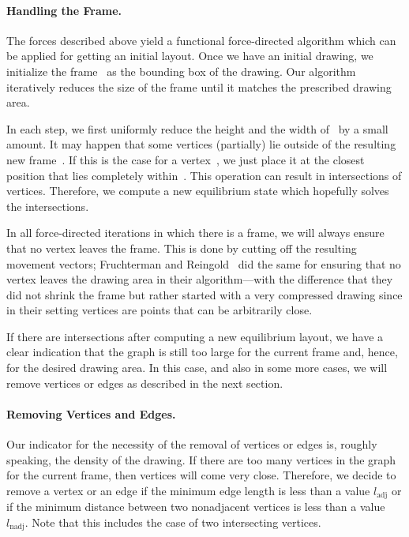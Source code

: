 \documentclass[]{llncs}
\newcommand{\ladj}{\ensuremath{l_\mathrm{adj}}\xspace}
\newcommand{\lnadj}{\ensuremath{l_\mathrm{nadj}}\xspace}
\begin{document}
\paragraph{Handling the Frame.}
\label{sec:gen-frame-handling}
The forces described above yield a functional
force-directed algorithm which can be applied for getting an
initial layout. Once we have an initial drawing, we initialize the
frame~ as the bounding box of the drawing. Our algorithm
iteratively reduces the size of the frame until it matches the
prescribed drawing area.

In each step, we first uniformly reduce the height and the width
of~ by a small amount. It may happen that some vertices (partially)
lie outside of the resulting new frame~. If this is the case for a
vertex~, we just place it at the closest position that lies
completely within~. This operation can result in intersections of
vertices. Therefore, we compute a new equilibrium state which
hopefully solves the intersections.

In all force-directed iterations in which there is a frame, we
will always ensure that no vertex leaves the frame. This is done by
cutting off the resulting movement vectors; Fruchterman and
Reingold~\cite{Fruchterman1991} did the same for ensuring that no
vertex leaves the drawing area in their algorithm---with the
difference that they did not shrink the frame but rather started with
a very compressed drawing since in their setting vertices are points
that can be arbitrarily close.

If there are intersections after computing a new equilibrium layout,
we have a clear indication that the graph is still too large for the
current frame and, hence, for the desired drawing area. In this case,
and also in some more cases, we will remove vertices or edges as
described in the next section.


\paragraph{Removing Vertices and Edges.}
\label{sec:gen-remove}
Our indicator for the necessity of the removal of vertices or edges
is, roughly speaking, the density of the drawing. If there are too
many vertices in the graph for the current frame, then vertices will
come very close. Therefore, we decide to remove a vertex or an edge if
the minimum edge length is less than a value \ladj or if the minimum
distance between two nonadjacent vertices is less than a value \lnadj.
Note that this includes the case of two intersecting vertices.
\end{document}
